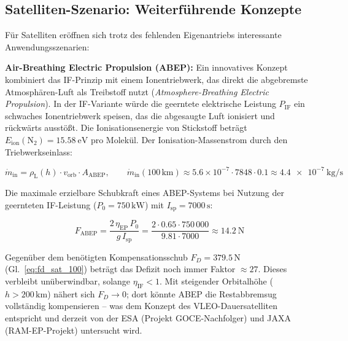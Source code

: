 ﻿\documentclass[12pt, a4paper]{report}
\theoremstyle{definition}
\theoremstyle{remark}
\newcommand{\rhoL}{\rho_{\text{L}}}
\begin{document}
\subsection{Satelliten-Szenario: Weiterführende Konzepte}
\label{ssec:ausblick_satellit}

Für Satelliten eröffnen sich trotz des fehlenden Eigenantriebs interessante
Anwendungsszenarien:

\textbf{Air-Breathing Electric Propulsion (ABEP):}
Ein innovatives Konzept kombiniert das IF-Prinzip mit einem Ionentriebwerk,
das direkt die abgebremste Atmosphären-Luft als Treibstoff nutzt
(\emph{Atmosphere-Breathing Electric Propulsion}). In der IF-Variante
würde die geerntete elektrische Leistung $P_{\text{IF}}$ ein schwaches
Ionentriebwerk speisen, das die abgesaugte Luft ionisiert und rückwärts
ausstößt. Die Ionisationsenergie von Stickstoff beträgt
$E_{\text{ion}}(\text{N}_2) = \SI{15.58}{\electronvolt}$ pro Molekül. Der
Ionisation-Massenstrom durch den Triebwerkseinlass:

\begin{equation}
  \dot{m}_{\text{in}} = \rhoL(h) \cdot v_{\text{orb}} \cdot A_{\text{ABEP}},
  \qquad \dot{m}_{\text{in}}(100\,\text{km}) \approx
  5.6\times10^{-7} \cdot 7848 \cdot 0.1 \approx \SI{4.4e-7}{\kilo\gram\per\second}
  \label{eq:mdot_abep}
\end{equation}

Die maximale erzielbare Schubkraft eines ABEP-Systems bei Nutzung der
geernteten IF-Leistung ($P_0 = 750\,\text{kW}$) mit $I_{\text{sp}} = 7000\,\text{s}$:

\begin{equation}
  F_{\text{ABEP}} = \frac{2\,\eta_{\text{EP}}\,P_0}{g\,I_{\text{sp}}}
  = \frac{2 \cdot 0.65 \cdot 750\,000}{9.81 \cdot 7000}
  \approx \SI{14.2}{\newton}
  \label{eq:f_abep}
\end{equation}

Gegenüber dem benötigten Kompensationsschub $F_D = 379.5\,\text{N}$ (Gl.~\eqref{eq:fd_sat_100})
beträgt das Defizit noch immer Faktor $\approx 27$. Dieses verbleibt unüberwindbar,
solange $\eta_{\text{IF}} < 1$. Mit steigender Orbitalhöhe ($h > 200\,\text{km}$)
nähert sich $F_D \to 0$; dort könnte ABEP die Restabbremsug vollständig
kompensieren -- was dem Konzept des VLEO-Dauersatelliten entspricht und derzeit
von der ESA (Projekt GOCE-Nachfolger) und JAXA (RAM-EP-Projekt) untersucht wird.
\end{document}
